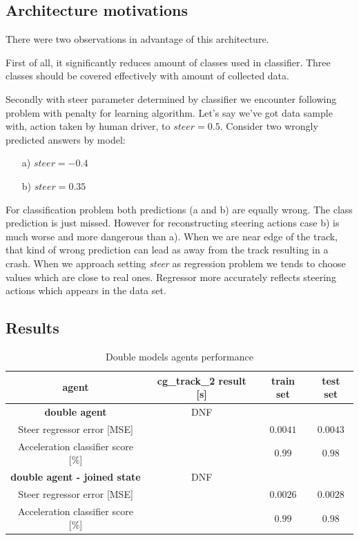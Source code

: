 \documentclass[declaration,shortabstract,english,inz]{iithesis}
\begin{document}
\subsection{Architecture motivations}

There were two observations in advantage of this architecture.


First of all, it significantly reduces amount of classes used in classifier.
Three classes should be covered effectively with amount of collected data.

Secondly with steer parameter determined by classifier we encounter following problem with penalty for learning algorithm.
Let's say we've got data sample with, action taken by human driver, to $steer=0.5$.
Consider two wrongly predicted answers by model:
\begin{itemize}
    \item[a)] $steer=-0.4$
    \item[b)] $steer=0.35$
\end{itemize}

For classification problem both predictions (a and b) are equally wrong.
 The class prediction is just missed.
However for reconstructing steering actions case b) is much worse and more dangerous than a).
When we are near edge of the track, that kind of wrong prediction can lead as away from the track resulting in a crash.
When we approach setting \textit{steer} as regression problem we tends to choose values which are close to real ones.
Regressor more accurately reflects steering actions which appears in the data set.

\subsection{Results}

\begin{table}[h]
    \centering
    \begin{tabular}{ |c|c|c|c|}
          \hline
          agent & cg\_track\_2 result [s] & train set & test set \\
          \hline
          \textbf{double agent} & DNF &   &  \\
          \hline
          Steer regressor error [MSE]&   & $0.0041$ & $0.0043$\\
          \hline
          Acceleration classifier score [\%]&  & $0.99$ & $0.98$ \\
          \hline
          \textbf{double agent - joined state} & DNF &   &  \\
          \hline
          Steer regressor error [MSE]&   & $0.0026$ & $0.0028$\\
          \hline
          Acceleration classifier score [\%]&  & $0.99$ & $0.98$ \\
          \hline
          
        \end{tabular}
        \caption{Double models agents performance}
        \label{tab:double_models_results}

\end{table}
\end{document}
